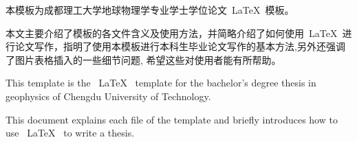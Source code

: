 \begin{cnabstract}
本模板为成都理工大学地球物理学专业学士学位论文~\LaTeX~模板。

本文主要介绍了模板的各文件含义及使用方法，并简略介绍了如何使用~\LaTeX~进行论文写作，指明了使用本模板进行本科生毕业论文写作的基本方法,另外还强调了图片表格插入的一些细节问题, 希望这些对使用者能有所帮助。

\end{cnabstract}
\vspace{1em}\par


\begin{enabstract}
This template is the ~\LaTeX~ template for the bachelor's degree thesis in geophysics of Chengdu University of Technology.

This document explains each file of the template and briefly introduces how to use ~\LaTeX~ to write a thesis.

\end{enabstract}
\vspace{1em}\par



